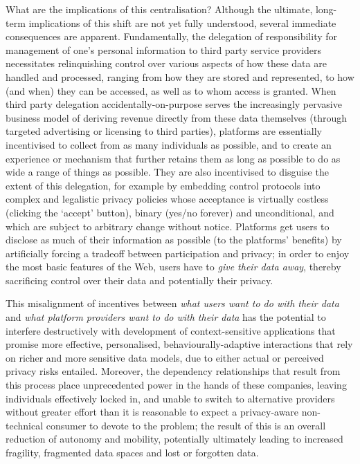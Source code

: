 \documentclass[graybox]{svmult}
\begin{document}
What are the implications of this centralisation?  Although the ultimate, long-term implications of this shift are not yet fully understood, several immediate consequences are apparent. Fundamentally, the delegation of responsibility for management of one's personal information to third party service providers necessitates relinquishing control over various aspects of how these data are handled and processed, ranging from how they are stored and represented, to how (and when) they can be accessed, as well as to whom access is granted.  When third party delegation accidentally-on-purpose serves the increasingly pervasive business model of deriving revenue directly from these data themselves (through targeted advertising or licensing to third parties), platforms are essentially incentivised to collect from as many individuals as possible, and to create an experience or mechanism that further retains them as long as possible to do as wide a range of things as possible. They are also incentivised to disguise the extent of this delegation, for example by embedding control protocols into complex and legalistic privacy policies whose acceptance is virtually costless (clicking the `accept' button), binary (yes/no forever) and unconditional, and which are subject to arbitrary change without notice. Platforms get users to disclose as much of their information as possible (to the platforms' benefits) by artificially forcing a tradeoff between participation and privacy; in order to enjoy the most basic features of the Web, users have to \emph{give their data away}, thereby sacrificing control over their data and potentially their privacy.

This misalignment of incentives between \emph{what users want to do with their data} and \emph{what platform providers want to do with their data} has the potential to interfere destructively with development of context-sensitive applications that promise more effective, personalised, behaviourally-adaptive interactions that rely on richer and more sensitive data models, due to either actual or perceived privacy risks entailed.  Moreover, the dependency relationships that result from this process place unprecedented power in the hands of these companies, leaving individuals effectively locked in, and unable to switch to alternative providers without greater effort than it is reasonable to expect a privacy-aware non-technical consumer to devote to the problem; the result of this is an overall reduction of autonomy and mobility, potentially ultimately leading to increased fragility, fragmented data spaces and lost or forgotten data\cite{lostlegacy}.
\end{document}
